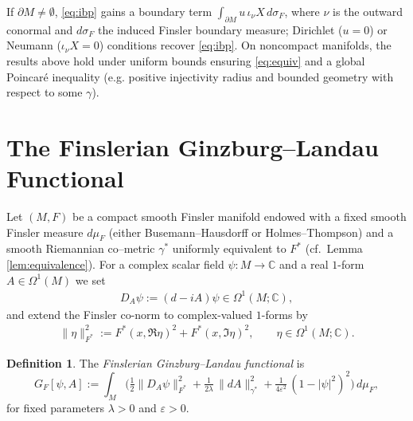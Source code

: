 \documentclass[fleqn,11pt,twoside]{article}
\theoremstyle{definition}
\newtheorem*{definition}{Definition}
\newtheorem{remark}{Remark}
\begin{document}
If $\partial M\neq\emptyset$, \eqref{eq:ibp} gains a boundary term
$\int_{\partial M}\! u\, \iota_\nu X\, d\sigma_F$, where $\nu$ is the outward conormal and $d\sigma_F$ the induced Finsler boundary measure; Dirichlet ($u=0$) or Neumann ($\iota_\nu X=0$) conditions recover \eqref{eq:ibp}. On noncompact manifolds, the results above hold under uniform bounds ensuring \eqref{eq:equiv} and a global Poincar\'e inequality (e.g. positive injectivity radius and bounded geometry with respect to some $\gamma$).


\section{The Finslerian Ginzburg--Landau Functional}
\label{sec:functional}

Let $(M,F)$ be a compact smooth Finsler manifold endowed with a fixed smooth Finsler measure $d\mu_F$ (either Busemann--Hausdorff or Holmes--Thompson) and a smooth Riemannian co--metric $\gamma^*$ uniformly equivalent to $F^*$
(cf.\ Lemma \ref{lem:equivalence}). For a complex scalar field $\psi:M\to\mathbb{C}$ and a real $1$-form $A\in\Omega^1(M)$ we set
\begin{align*}
D_A\psi := (d - iA)\psi \in \Omega^1(M;\mathbb{C}),
\end{align*}
and extend the Finsler co-norm to complex-valued $1$-forms by
\begin{align*}
\| \eta \|_{F^*}^2 := F^*(x,\Re \eta)^2 + F^*(x,\Im \eta)^2, \qquad \eta\in\Omega^1(M;\mathbb{C}).
\end{align*}
\begin{definition}
The \emph{Finslerian Ginzburg--Landau functional} is
\begin{equation}\label{eq:GL-functional-Finsler}
G_F[\psi,A]
:= \int_M \Big( \tfrac 12 \|D_A\psi\|_{F^*}^2
+ \tfrac{1}{2\lambda}\, \| dA \|_{\gamma^*}^2
+ \tfrac{1}{4\varepsilon^2}\,(1-|\psi|^2)^2 \Big)\, d\mu_F,
\end{equation}
for fixed parameters $\lambda>0$ and $\varepsilon>0$.
\end{definition}

\end{document}
